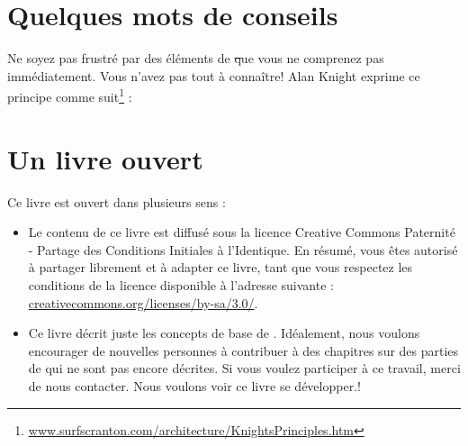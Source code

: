 \documentclass[a4paper,10pt,twoside]{book}
\begin{document}
\ifluluelse{}{\newpage} %
\section*{Quelques mots de conseils}


Ne soyez pas frustr\'e par des \'el\'ements de \st que vous ne comprenez pas imm\'ediatement.
Vous n'avez pas tout \`a conna\^itre!
Alan Knight exprime ce principe comme suit\footnote{\url{www.surfscranton.com/architecture/KnightsPrinciples.htm}} :

\section*{Un livre ouvert}

Ce livre est ouvert dans plusieurs sens :

\begin{itemize}

\item	Le contenu de ce livre est diffus\'e sous la licence Creative Commons Paternit\'e - Partage des Conditions Initiales \`a l'Identique.
		En r\'esum\'e, vous \^etes autoris\'e \`a partager librement et \`a adapter ce livre, tant que vous respectez les conditions de la licence disponible \`a l'adresse suivante : 
		\url{creativecommons.org/licenses/by-sa/3.0/}.

\item	Ce livre d\'ecrit juste les concepts de base de \sq.
		Id\'ealement, nous voulons encourager de nouvelles personnes \`a contribuer \`a des chapitres sur des parties de \sq qui ne sont pas encore d\'ecrites.
		Si vous voulez participer \`a ce travail, merci de nous contacter. Nous voulons voir ce livre se d\'evelopper.!
\end{itemize}
\end{document}
